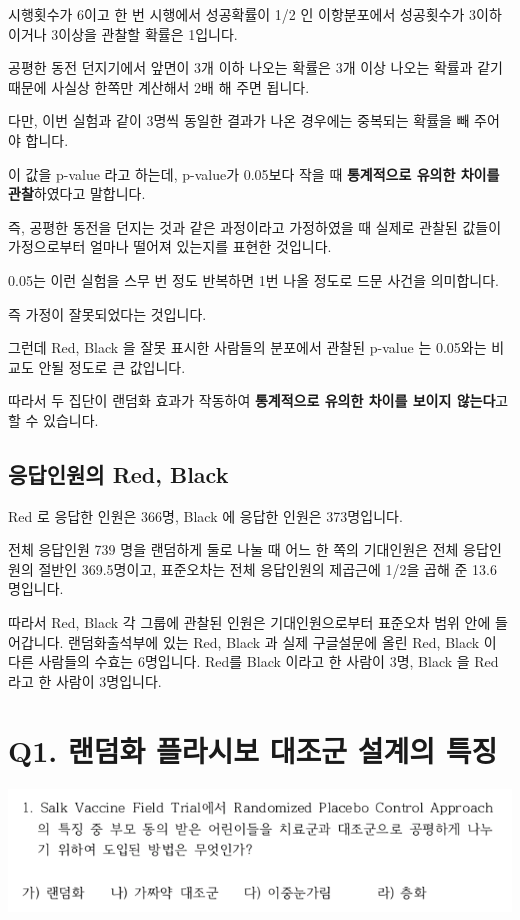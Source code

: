 \documentclass[
]{book}
\begin{document}
시행횟수가 6이고 한 번 시행에서 성공확률이 1/2 인 이항분포에서 성공횟수가 3이하이거나 3이상을 관찰할 확률은 1입니다.

공평한 동전 던지기에서 앞면이 3개 이하 나오는 확률은 3개 이상 나오는 확률과 같기 때문에 사실상 한쪽만 계산해서 2배 해 주면 됩니다.

다만, 이번 실험과 같이 3명씩 동일한 결과가 나온 경우에는 중복되는 확률을 빼 주어야 합니다.

이 값을 p-value 라고 하는데, p-value가 0.05보다 작을 때 \textbf{통계적으로 유의한 차이를 관찰}하였다고 말합니다.

즉, 공평한 동전을 던지는 것과 같은 과정이라고 가정하였을 때 실제로 관찰된 값들이 가정으로부터 얼마나 떨어져 있는지를 표현한 것입니다.

0.05는 이런 실험을 스무 번 정도 반복하면 1번 나올 정도로 드문 사건을 의미합니다.

즉 가정이 잘못되었다는 것입니다.

그런데 Red, Black 을 잘못 표시한 사람들의 분포에서 관찰된 p-value 는 0.05와는 비교도 안될 정도로 큰 값입니다.

따라서 두 집단이 랜덤화 효과가 작동하여 \textbf{통계적으로 유의한 차이를 보이지 않는다}고 할 수 있습니다.

\subsection{응답인원의 Red, Black}\label{uxc751uxb2f5uxc778uxc6d0uxc758-red-black-7}

Red 로 응답한 인원은 366명, Black 에 응답한 인원은 373명입니다.

전체 응답인원 739 명을 랜덤하게 둘로 나눌 때 어느 한 쪽의 기대인원은 전체 응답인원의 절반인 369.5명이고, 표준오차는 전체 응답인원의 제곱근에 1/2을 곱해 준 13.6 명입니다.

따라서 Red, Black 각 그룹에 관찰된 인원은 기대인원으로부터 표준오차 범위 안에 들어갑니다.
랜덤화출석부에 있는 Red, Black 과 실제 구글설문에 올린 Red, Black 이 다른 사람들의 수효는 6명입니다. Red를 Black 이라고 한 사람이 3명, Black 을 Red 라고 한 사람이 3명입니다.

\section{Q1. 랜덤화 플라시보 대조군 설계의 특징}\label{q1.-uxb79cuxb364uxd654-uxd50cuxb77cuxc2dcuxbcf4-uxb300uxc870uxad70-uxc124uxacc4uxc758-uxd2b9uxc9d5}

\begin{flushleft}\includegraphics[width=0.75\linewidth]{./pics/Quiz180409_01} \end{flushleft}
\end{document}

